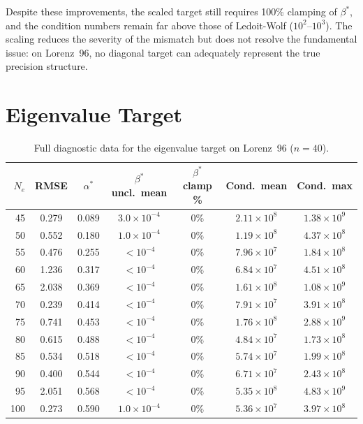 Despite these improvements, the scaled target still requires 100\% clamping of $\beta^*$, and the condition numbers remain far above those of Ledoit-Wolf ($10^2$--$10^3$). The scaling reduces the severity of the mismatch but does not resolve the fundamental issue: on Lorenz~96, no diagonal target can adequately represent the true precision structure.

\section{Eigenvalue Target}
\label{app:diag_eigenvalue}

\begin{table}[htbp]
\centering
\caption{Full diagnostic data for the eigenvalue target on Lorenz~96 ($n = 40$).}
\label{tab:diag_eigenvalue}
\begin{tabular}{@{}rcccccc@{}}
\toprule
$N_e$ & RMSE & $\alpha^*$ & $\beta^*$ uncl.\ mean & $\beta^*$ clamp \% & Cond.\ mean & Cond.\ max \\
\midrule
45  & 0.279 & 0.089 & $3.0 \times 10^{-4}$ & 0\% & $2.11 \times 10^8$  & $1.38 \times 10^9$ \\
50  & 0.552 & 0.180 & $1.0 \times 10^{-4}$ & 0\% & $1.19 \times 10^8$  & $4.37 \times 10^8$ \\
55  & 0.476 & 0.255 & $< 10^{-4}$          & 0\% & $7.96 \times 10^7$  & $1.84 \times 10^8$ \\
60  & 1.236 & 0.317 & $< 10^{-4}$          & 0\% & $6.84 \times 10^7$  & $4.51 \times 10^8$ \\
65  & 2.038 & 0.369 & $< 10^{-4}$          & 0\% & $1.61 \times 10^8$  & $1.08 \times 10^9$ \\
70  & 0.239 & 0.414 & $< 10^{-4}$          & 0\% & $7.91 \times 10^7$  & $3.91 \times 10^8$ \\
75  & 0.741 & 0.453 & $< 10^{-4}$          & 0\% & $1.76 \times 10^8$  & $2.88 \times 10^9$ \\
80  & 0.615 & 0.488 & $< 10^{-4}$          & 0\% & $4.84 \times 10^7$  & $1.73 \times 10^8$ \\
85  & 0.534 & 0.518 & $< 10^{-4}$          & 0\% & $5.74 \times 10^7$  & $1.99 \times 10^8$ \\
90  & 0.400 & 0.544 & $< 10^{-4}$          & 0\% & $6.71 \times 10^7$  & $2.43 \times 10^8$ \\
95  & 2.051 & 0.568 & $< 10^{-4}$          & 0\% & $5.35 \times 10^8$  & $4.83 \times 10^9$ \\
100 & 0.273 & 0.590 & $1.0 \times 10^{-4}$ & 0\% & $5.36 \times 10^7$  & $3.97 \times 10^8$ \\
\bottomrule
\end{tabular}
\end{table}

